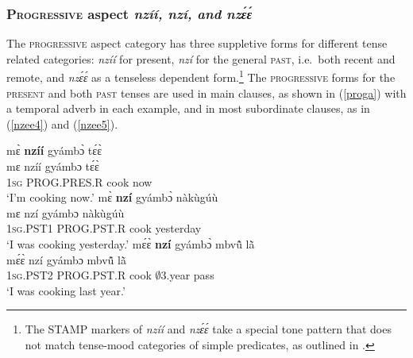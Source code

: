 














\subsubsection{\textsc{Progressive} aspect {\itshape nzíí, nzí, and nzɛ́ɛ́}}
\label{sec:PROG}

The \textsc{progressive} aspect category has three suppletive forms for different tense related categories: {\itshape nzíí} for present, {\itshape nzí} for the general \textsc{past}, i.e.\ both recent and remote, and {\itshape nzɛ́ɛ́} as a tenseless dependent form.\footnote{The STAMP markers of {\itshape nzíí} and {\itshape nzɛ́ɛ́ } take a special tone pattern that does not match tense-mood categories of simple predicates, as outlined in .}
The \textsc{progressive} forms for the \textsc{present} and both \textsc{past} tenses are used in main clauses, as shown in (\ref{proga}) with a temporal adverb in each example, and in most subordinate clauses, as in (\ref{nzee4}) and (\ref{nzee5}).

\begin{exe} 
\ex\label{proga}
\begin{xlist}
\ex\label{proga1}
  \glll     mɛ̀ {\bfseries nzíí} gyámbɔ̀ tɛ́ɛ̀ \\
           mɛ nzíí gyámbɔ tɛ́ɛ̀ \\
              1\textsc{sg} PROG.PRES.R cook now  \\
    \trans `I'm cooking now.'
\ex\label{proga2}
  \glll   mɛ̀ {\bfseries nzí} gyámbɔ̀ nàkùgúù \\
          mɛ nzí gyámbɔ nàkùgúù \\
              1\textsc{sg}.PST1 PROG.PST.R cook yesterday  \\
    \trans `I was cooking yesterday.'
\ex\label{proga2}
  \glll   mɛ́ɛ̀ {\bfseries nzí} gyámbɔ̀ mbvũ̂ lã̀ \\
          mɛ́ɛ̀ nzí gyámbɔ mbvũ̂ lã̀ \\
              1\textsc{sg}.PST2 PROG.PST.R cook $\emptyset$3.year pass  \\
    \trans `I was cooking last year.'
\end{xlist}
\end{exe}

